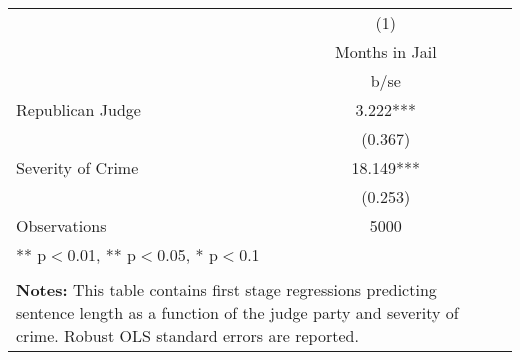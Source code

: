 \begin{tabular}{l*{2}{c}}
\hline\hline
                    &\multicolumn{1}{c}{(1)}\\
                    &\multicolumn{1}{c}{Months in Jail}\\
                    &        b/se         \\
\hline
Republican Judge    &       3.222***\\
                    &     (0.367)         \\
Severity of Crime   &      18.149***\\
                    &     (0.253)         \\
\hline
Observations        &        5000         \\

\multicolumn{2}{p{0.6\linewidth}}{\small *** p$<$0.01, ** p$<$0.05, * p$<$0.1} \\
\\
\multicolumn{2}{p{0.6\linewidth}}{\small \textbf{Notes:} This table contains first stage regressions predicting sentence length as a function of the judge party and severity of crime. Robust OLS standard errors are reported.} \\
\end{tabular}
